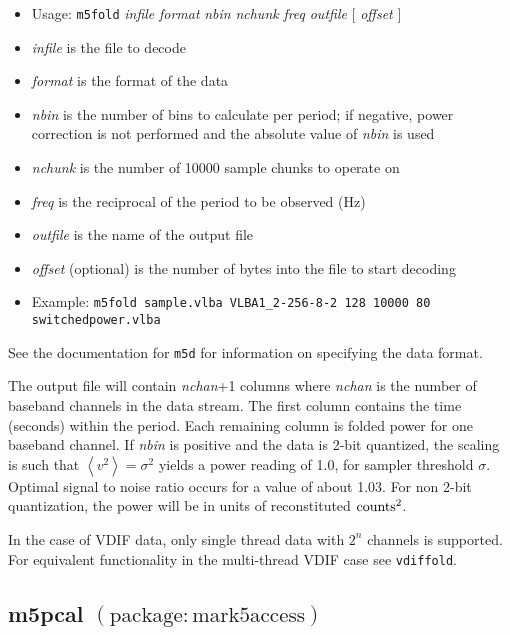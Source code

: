 \begin{itemize}
\item[] Usage: {\tt m5fold} {\em infile} {\em format} {\em nbin} {\em nchunk} {\em freq} {\em outfile} $[$ {\em offset} $]$ 
\item[] {\em infile} is the file to decode
\item[] {\em format} is the format of the data
\item[] {\em nbin} is the number of bins to calculate per period; if negative, power correction is not performed and the absolute value of {\em nbin} is used
\item[] {\em nchunk} is the number of 10000 sample chunks to operate on
\item[] {\em freq} is the reciprocal of the period to be observed (Hz)
\item[] {\em outfile} is the name of the output file
\item[] {\em offset} (optional) is the number of bytes into the file to start decoding
\item[] Example: {\tt m5fold sample.vlba VLBA1\_2-256-8-2 128 10000 80 switchedpower.vlba}
\end{itemize}

See the documentation for {\tt m5d} for information on specifying the data format.

The output file will contain {\em nchan}+1 columns where {\em nchan} is the number of baseband channels in the data stream.
The first column contains the time (seconds) within the period.
Each remaining column is folded power for one baseband channel.
If {\em nbin} is positive and the data is 2-bit quantized, the scaling is such that $\left<v^2\right> = \sigma^2$ yields a power reading of 1.0, for sampler threshold $\sigma$.
Optimal signal to noise ratio occurs for a value of about 1.03.
For non 2-bit quantization, the power will be in units of reconstituted ${\rm counts}^2$.

In the case of VDIF data, only single thread data with $2^n$ channels is supported.
For equivalent functionality in the multi-thread VDIF case see {\tt vdiffold}.









\subsection{m5pcal {\small $\mathrm{(package: mark5access)}$}} \label{sec:m5pcal}

